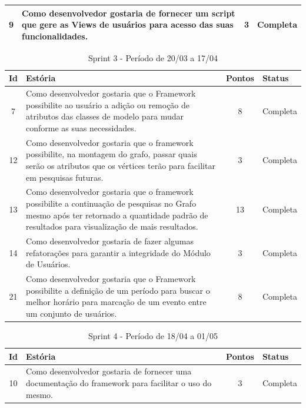 \begin{apendicesenv}
\begin{table}[!h]
\begin{adjustbox}{width=\textwidth}
\begin{tabular}{@{}cp{10cm}cl@{}}
9 & Como desenvolvedor gostaria de fornecer um script que gere as Views de usuários para acesso das suas funcionalidades. & 3 & Completa \\ \bottomrule
\end{tabular}
\end{adjustbox}
\end{table}

\begin{table}[!h]
\centering
\caption{Sprint 3 - Período de 20/03 a 17/04}
\label{sprint_3}
\begin{adjustbox}{width=\textwidth}
\begin{tabular}{@{}cp{10cm}cl@{}}
\toprule
\textbf{Id}  & \textbf{Estória} & \textbf{Pontos} & \textbf{Status} \\ \midrule
7 & Como desenvolvedor gostaria que o Framework possibilite ao usuário a adição ou remoção de atributos das classes de modelo para mudar conforme as suas necessidades. & 8 & Completa \\

12 & Como desenvolvedor gostaria que o framework possibilite, na montagem do grafo, passar quais serão os atributos que os vértices terão para facilitar em pesquisas futuras. & 3 & Completa \\

13 & Como desenvolvedor gostaria que o framework possibilite a continuação de pesquisas no Grafo mesmo após ter retornado a quantidade padrão de resultados para visualização de mais resultados. & 13 & Completa \\

14 & Como desenvolvedor gostaria de fazer algumas refatorações para garantir a integridade do Módulo de Usuários. & 3 & Completa \\

21 & Como desenvolvedor gostaria que o Framework possibilite a definição de um período para buscar o melhor horário para marcação de um evento entre um conjunto de usuários. & 8 & Completa \\ \bottomrule

\end{tabular}
\end{adjustbox}
\end{table}

\begin{table}[!h]
\centering
\caption{Sprint 4 - Período de 18/04 a 01/05}
\label{sprint_4}
\begin{adjustbox}{width=\textwidth}
\begin{tabular}{@{}cp{10cm}cl@{}}
\toprule
\textbf{Id}  & \textbf{Estória} & \textbf{Pontos} & \textbf{Status} \\ \midrule
10 & Como desenvolvedor gostaria de fornecer uma documentação do framework para facilitar o uso do mesmo. & 3 & Completa \\


\end{tabular}
\end{adjustbox}
\end{table}
\end{apendicesenv}
